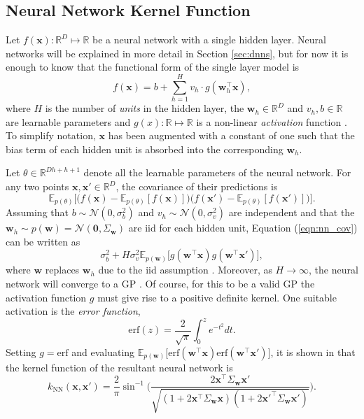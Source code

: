 \documentclass[msc,deptreport.inf]{infthesis} %
\newcommand{\matr}[1]{\mathbf{#1}}
\newcommand{\R}{\mathbb R}
\newcommand{\E}{\mathbb E}
\begin{document}
\subsection{Neural Network Kernel Function}

Let $f(\matr{x}): \R^D \mapsto \R$ be a neural network with a single hidden layer. Neural networks will be explained in more detail in Section \ref{sec:dnns}, but for now it is enough to know that the functional form of the single layer model is
\begin{equation}
	f(\matr{x}) = b + \sum_{h=1}^H v_h \cdot g(\matr{w}_h^\intercal \matr{x}),
\end{equation} 
where $H$ is the number of \emph{units} in the hidden layer, the $\matr{w}_h \in \R^D$ and $v_h, b \in \R$ are learnable parameters and $g(x):\R \mapsto \R$ is a non-linear \emph{activation} function \cite{goodfellow2016}. To simplify notation, $\matr{x}$ has been augmented with a constant of one such that the bias term of each hidden unit is absorbed into the corresponding $\matr{w}_h$.

Let $\theta \in \R^{Dh + h + 1}$ denote all the learnable parameters of the neural network. For any two points $\matr{x}, \matr{x}' \in \R^D$, the covariance of their predictions is 
\begin{equation}\label{eqn:nn_cov}
	\E_{p(\theta)}\Big[\big(f(\matr{x}) - \E_{p(\theta)}[f(\matr{x})]\big) \big(f(\matr{x}') - \E_{p(\theta)}[f(\matr{x}')]\big)\Big].
\end{equation} 
Assuming that $b \sim \mathcal{N}(0, \sigma_b^2)$ and $v_h \sim \mathcal{N}(0, \sigma_v^2)$ are independent and that the $\matr{w}_h \sim p(\matr{w}) = \mathcal{N}(\matr{0}, \Sigma_{\matr{w}})$ are iid for each hidden unit, Equation (\ref{eqn:nn_cov}) can be written as 
\begin{equation}\label{eqn:simplified_nn_cov}
	\sigma_b^2 + H \sigma_v^2 \E_{p(\matr{w})} \big[ g(\matr{w}^\intercal \matr{x}) g(\matr{w}^\intercal \matr{x}') \big],
\end{equation} 
where $\matr{w}$ replaces $\matr{w}_h$ due to the iid assumption \cite{williams1997}. Moreover, as $H \rightarrow \infty$, the neural network will converge to a GP \cite{williams1997}. Of course, for this to be a valid GP the activation function $g$ must give rise to a positive definite kernel. One suitable activation is the \emph{error function}, 
\begin{equation}
	\text{erf}(z) = \frac{2}{\sqrt{\pi}} \int_0^z e^{-t^2} dt.
\end{equation}
Setting $g = \text{erf}$ and evaluating $\E_{p(\matr{w})} \big[ \text{erf}(\matr{w}^\intercal \matr{x}) \text{erf}(\matr{w}^\intercal \matr{x}') \big]$, it is shown in \cite{williams1997} that the kernel function of the resultant neural network is
\begin{equation}\label{eqn:nn_kernel}
	k_{\text{NN}}(\matr{x}, \matr{x}') = \frac{2}{\pi} \sin^{-1} 
	\Bigg( \frac{2\matr{x}^\intercal \Sigma_{\matr{w}} \matr{x}'}{\sqrt{(1 + 2\matr{x}^\intercal \Sigma_{\matr{w}} \matr{x}) (1 + 2\matr{x}'^\intercal \Sigma_{\matr{w}} \matr{x}')}} \Bigg).
\end{equation}
\end{document}
